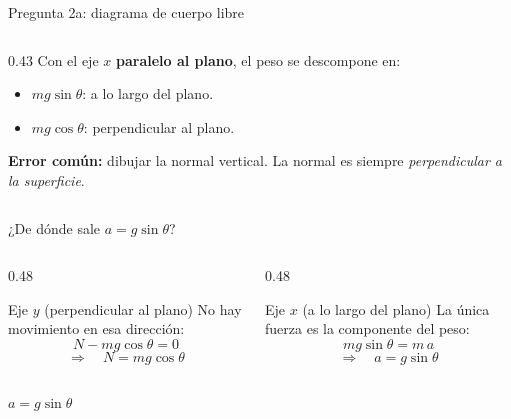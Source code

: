 \documentclass[aspectratio=169,xcolor=dvipsnames]{beamer}
\begin{document}
\begin{frame}{Pregunta 2a: diagrama de cuerpo libre}
\begin{columns}[T]
\begin{column}{0.43\textwidth}
				\vspace{0.3cm}
				Con el eje $x$ \textbf{paralelo al plano}, el peso se descompone en:
				\begin{itemize}
					\item \textcolor{StripB}{$mg\sin\theta$}: a lo largo del plano.
					\item \textcolor{StripB}{$mg\cos\theta$}: perpendicular al plano.
				\end{itemize}
				
				\vspace{0.3cm}
				\textcolor{UnalGreen}{\textbf{Error común:}} dibujar la normal
				vertical. La normal es siempre \emph{perpendicular a la superficie}.
			\end{column}
		\end{columns}
	\end{frame}
	
	\begin{frame}{¿De dónde sale $a = g\sin\theta$?}
		\begin{columns}[T]
			\begin{column}{0.48\textwidth}
				\begin{block}{Eje $y$ (perpendicular al plano)}
					No hay movimiento en esa dirección:
					\[
					N - mg\cos\theta = 0
					\]
					\[
					\Rightarrow\quad N = mg\cos\theta
					\]
				\end{block}
			\end{column}
			\begin{column}{0.48\textwidth}
				\begin{block}{Eje $x$ (a lo largo del plano)}
					La única fuerza es la componente del peso:
					\[
					mg\sin\theta = m\,a
					\]
					\[
					\Rightarrow\quad a = g\sin\theta
					\]
				\end{block}
			\end{column}
		\end{columns}
		
		\vspace{0.5cm}
		\begin{exampleblock}{}
			\centering
			\Large $a = g\sin\theta$
		\end{exampleblock}
	\end{frame}
	
\end{document}
